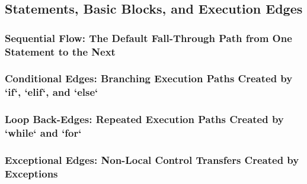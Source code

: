 \subsection{Statements, Basic Blocks, and Execution Edges}
\subsubsection{Sequential Flow: The Default Fall-Through Path from One Statement to the Next}
\subsubsection{Conditional Edges: Branching Execution Paths Created by `if`, `elif`, and `else`}
\subsubsection{Loop Back-Edges: Repeated Execution Paths Created by `while` and `for`}
\subsubsection{Exceptional Edges: Non-Local Control Transfers Created by Exceptions}
